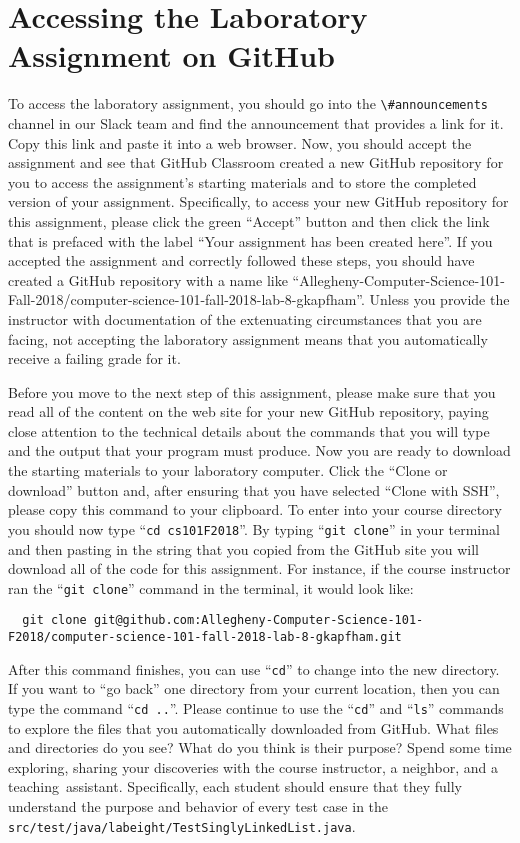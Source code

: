 \documentclass[11pt]{article}
\newcommand{\testprogramsource}{\lstinline{src/test/java/labeight/TestSinglyLinkedList.java}}
\newcommand{\command}[1]{``\lstinline{#1}''}
\newcommand{\channel}[1]{\lstinline{#1}}
\newcommand{\step}[1]{``{#1}''}
\begin{document}
\section*{Accessing the Laboratory Assignment on GitHub}

To access the laboratory assignment, you should go into the
\channel{\#announcements} channel in our Slack team and find the announcement
that provides a link for it. Copy this link and paste it into a web browser.
Now, you should accept the assignment and see that GitHub Classroom created a
new GitHub repository for you to access the assignment's starting materials and
to store the completed version of your assignment. Specifically, to access your
new GitHub repository for this assignment, please click the green ``Accept''
button and then click the link that is prefaced with the label ``Your assignment
has been created here''. If you accepted the assignment and correctly followed
these steps, you should have created a GitHub repository with a name like
``Allegheny-Computer-Science-101-Fall-2018/computer-science-101-fall-2018-lab-8-gkapfham''.
Unless you provide the instructor with documentation of the extenuating
circumstances that you are facing, not accepting the laboratory assignment means
that you automatically receive a failing grade for it.

Before you move to the next step of this assignment, please make sure that you
read all of the content on the web site for your new GitHub repository, paying
close attention to the technical details about the commands that you will type
and the output that your program must produce. Now you are ready to download the
starting materials to your laboratory computer. Click the ``Clone or download''
button and, after ensuring that you have selected ``Clone with SSH'', please
copy this command to your clipboard. To enter into your course directory you
should now type \command{cd cs101F2018}. By typing \command{git clone} in your
terminal and then pasting in the string that you copied from the GitHub site you
will download all of the code for this assignment. For instance, if the course
instructor ran the \command{git clone} command in the terminal, it would look
like:

\begin{lstlisting}
  git clone git@github.com:Allegheny-Computer-Science-101-F2018/computer-science-101-fall-2018-lab-8-gkapfham.git
\end{lstlisting}

After this command finishes, you can use \command{cd} to change into the new
directory. If you want to \step{go back} one directory from your current
location, then you can type the command \command{cd ..}. Please continue to use
the \command{cd} and \command{ls} commands to explore the files that you
automatically downloaded from GitHub. What files and directories do you see?
What do you think is their purpose? Spend some time exploring, sharing your
discoveries with the course instructor, a neighbor, and a \mbox{teaching
assistant}. Specifically, each student should ensure that they fully understand
the purpose and behavior of every test case in the \testprogramsource{}.
\end{document}
